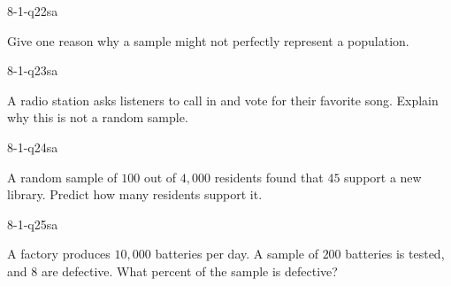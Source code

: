 \begin{practiceQuestion}{8-1-q22}{sa}
\begin{questionText}
Give one reason why a sample might not perfectly represent a population.
\end{questionText}
\end{practiceQuestion}

\begin{practiceQuestion}{8-1-q23}{sa}
\begin{questionText}
A radio station asks listeners to call in and vote for their favorite song. Explain why this is not a random sample.
\end{questionText}
\end{practiceQuestion}

\begin{practiceQuestion}{8-1-q24}{sa}
\begin{questionText}
A random sample of $100$ out of $4{,}000$ residents found that $45$ support a new library. Predict how many residents support it.
\end{questionText}
\end{practiceQuestion}

\begin{practiceQuestion}{8-1-q25}{sa}
\begin{questionText}
A factory produces $10{,}000$ batteries per day. A sample of $200$ batteries is tested, and $8$ are defective. What percent of the sample is defective?
\end{questionText}
\end{practiceQuestion}


